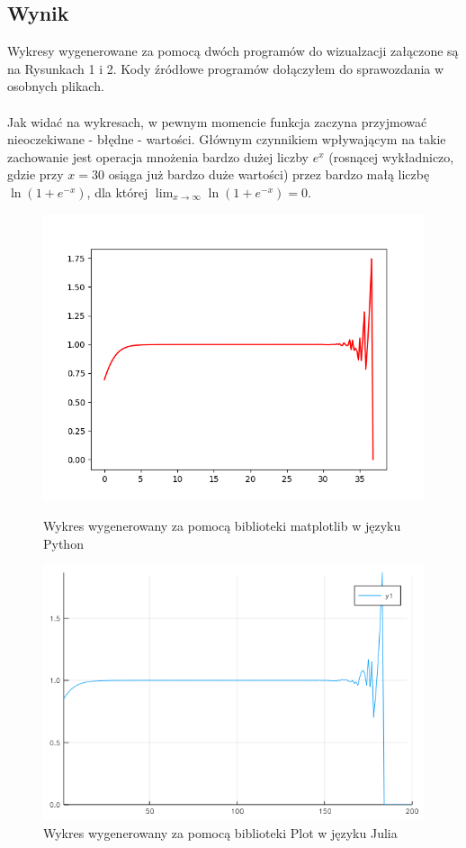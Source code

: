 \subsection{Wynik}
Wykresy wygenerowane za pomocą dwóch programów do wizualzacji załączone są na Rysunkach 1 i 2. Kody źródłowe programów dołączyłem do sprawozdania w osobnych plikach. \\\\
Jak widać na wykresach, w pewnym momencie funkcja zaczyna przyjmować nieoczekiwane - błędne - wartości. Głównym czynnikiem wpływającym na takie zachowanie jest operacja mnożenia bardzo dużej liczby $ e^x $ (rosnącej wykładniczo, gdzie przy $ x = 30 $ osiąga już bardzo duże wartości) przez bardzo małą liczbę $ \ln(1 + e ^{-x}) $, dla której $ \lim_{x \to \infty} \ln (1 + e^{-x}) = 0$.
\begin{figure}[!htbp]
  \centering  
  \includegraphics[totalheight=6cm]{../source/task-2/matplotlib.png}
  \caption{Wykres wygenerowany za pomocą biblioteki matplotlib w języku Python}
  \includegraphics[totalheight=5cm]{../source/task-2/juliaplot.png}
  \caption{Wykres wygenerowany za pomocą biblioteki Plot w języku Julia}
\end{figure}
